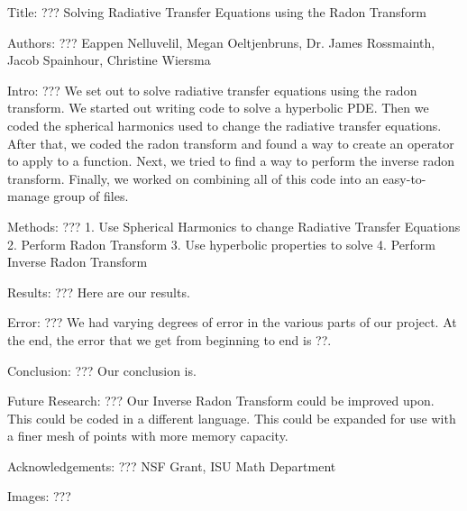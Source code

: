 Title:													 										???
Solving Radiative Transfer Equations using the Radon Transform

Authors:																						???
Eappen Nelluvelil, Megan Oeltjenbruns, Dr. James Rossmainth, Jacob Spainhour, Christine Wiersma

Intro: 																						???
We set out to solve radiative transfer equations using the radon transform. We started out writing code to solve a hyperbolic PDE. Then we coded the spherical harmonics used to change the radiative transfer equations. After that, we coded the radon transform and found a way to create an operator to apply to a function. Next, we tried to find a way to perform the inverse radon transform. Finally, we worked on combining all of this code into an easy-to-manage group of files.

Methods: 																						???
1. Use Spherical Harmonics to change Radiative Transfer Equations
2. Perform Radon Transform
3. Use hyperbolic properties to solve
4. Perform Inverse Radon Transform

Results:  																						???
Here are our results.

Error:  																						???
We had varying degrees of error in the various parts of our project. At the end, the error that we get from beginning to end is ??.

Conclusion:  																					???
Our conclusion is.

Future Research:																				???
Our Inverse Radon Transform could be improved upon.
This could be coded in a different language.
This could be expanded for use with a finer mesh of points with more memory capacity.

Acknowledgements:  																			???
NSF Grant, ISU Math Department

Images:																						???